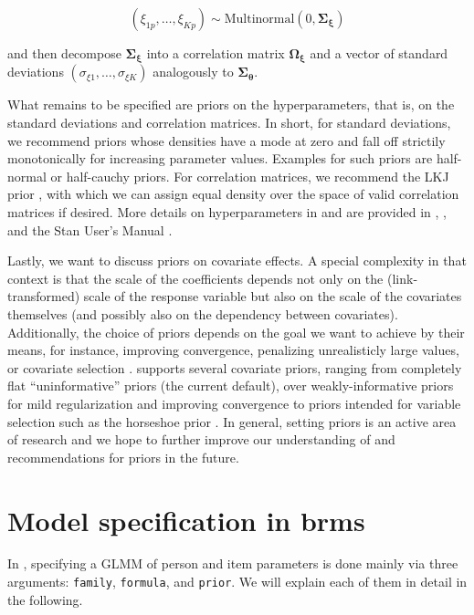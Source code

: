 \documentclass[jss]{jss}
\begin{document}
\[
(\xi_{1p}, \ldots, \xi_{Kp}) \sim \text{Multinormal}(0, \mathbf{\Sigma_\xi})
\]

and then decompose \(\mathbf{\Sigma_\xi}\) into a correlation matrix
\(\mathbf{\Omega_\xi}\) and a vector of standard deviations
\((\sigma_{\xi 1}, \ldots, \sigma_{\xi K})\) analogously to
\(\mathbf{\Sigma_\theta}\).

What remains to be specified are priors on the hyperparameters, that is,
on the standard deviations and correlation matrices. In short, for
standard deviations, we recommend priors whose densities have a mode at
zero and fall off strictily monotonically for increasing parameter
values. Examples for such priors are half-normal or half-cauchy priors.
For correlation matrices, we recommend the LKJ prior
\citep{lewandowski2009}, with which we can assign equal density over the
space of valid correlation matrices if desired. More details on
hyperparameters in  and  are provided in
\citet{brms1}, \citet{brms2}, and the Stan User's Manual
\citep{stanM2019}.

Lastly, we want to discuss priors on covariate effects. A special
complexity in that context is that the scale of the coefficients depends
not only on the (link-transformed) scale of the response variable but
also on the scale of the covariates themselves (and possibly also on the
dependency between covariates). Additionally, the choice of priors
depends on the goal we want to achieve by their means, for instance,
improving convergence, penalizing unrealisticly large values, or
covariate selection \citep[see also][]{gelman2017}.  supports
several covariate priors, ranging from completely flat ``uninformative''
priors (the current default), over weakly-informative priors for mild
regularization and improving convergence to priors intended for variable
selection such as the horseshoe prior
\citep{carvalho2010, piironen2017}. In general, setting priors is an
active area of research and we hope to further improve our understanding
of and recommendations for priors in the future.

\hypertarget{brms}{%
\section{Model specification in brms}\label{brms}}

In , specifying a GLMM of person and item parameters is done
mainly via three arguments: \texttt{family}, \texttt{formula}, and
\texttt{prior}. We will explain each of them in detail in the following.
\end{document}
